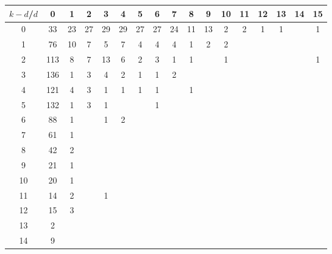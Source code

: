\documentclass{article}
\begin{document}
\begin{landscape}

\begin{table}[h]\footnotesize
{\centering
\begin{tabular}{|c|c|
c|c|c|c|c|c|c|c|c|c|c|c|c|c|c|}
  \hline
  $k-d$/$d$ 
 & 0 & 1 & 2 & 3 & 4 & 5 & 6 & 7 & 8 & 9 & 10 & 11 & 12 & 13 & 14 & 15\\

  \hline
  \hline

0  & 33 & 23 & 27 & 29 & 29 & 27 & 27 & 24 & 11 & 13 & 2 & 2 & 1 & 1 &  & 1\\

1  & 76 & 10 & 7 & 5 & 7 & 4 & 4 & 4 & 1 & 2 & 2 &  &  &  &  & \\

2  & 113 & 8 & 7 & 13 & 6 & 2 & 3 & 1 & 1 &  & 1 &  &  &  &  & 1\\

3  & 136 & 1 & 3 & 4 & 2 & 1 & 1 & 2 &  &  &  &  &  &  &  & \\

4  & 121 & 4 & 3 & 1 & 1 & 1 & 1 &  & 1 &  &  &  &  &  &  & \\

5  & 132 & 1 & 3 & 1 &  &  & 1 &  &  &  &  &  &  &  &  & \\

6  & 88 & 1 &  & 1 & 2 &  &  &  &  &  &  &  &  &  &  & \\

7  & 61 & 1 &  &  &  &  &  &  &  &  &  &  &  &  &  & \\

8  & 42 & 2 &  &  &  &  &  &  &  &  &  &  &  &  &  & \\

9  & 21 & 1 &  &  &  &  &  &  &  &  &  &  &  &  &  & \\

10  & 20 & 1 &  &  &  &  &  &  &  &  &  &  &  &  &  & \\

11  & 14 & 2 &  & 1 &  &  &  &  &  &  &  &  &  &  &  & \\

12  & 15 & 3 &  &  &  &  &  &  &  &  &  &  &  &  &  & \\

13  & 2 &  &  &  &  &  &  &  &  &  &  &  &  &  &  & \\

14  & 9 &  &  &  &  &  &  &  &  &  &  &  &  &  &  & \\


\end{tabular}}
\end{table}
\end{landscape}
\end{document}
